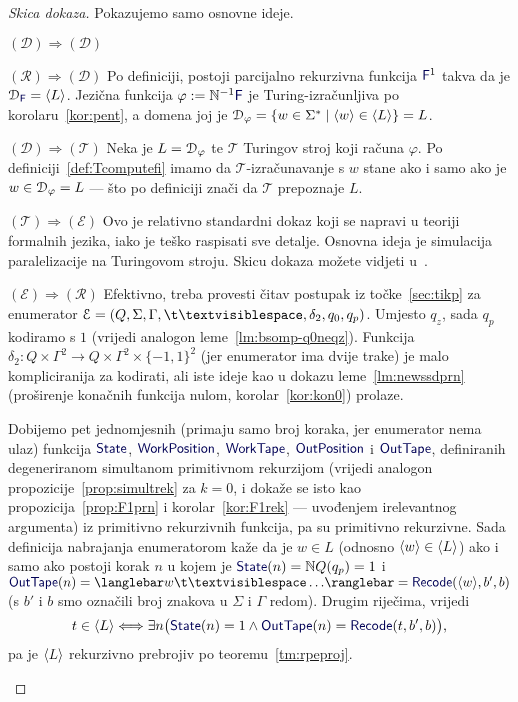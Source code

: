\begin{proof}[Skica dokaza] Pokazujemo samo osnovne ideje.
\begin{labeling}{$(\mathcal D)\Rightarrow(\mathcal D)$}
\item[$(\mathcal R)\Rightarrow(\mathcal D)$]
Po definiciji, postoji parcijalno rekurzivna funkcija $\f F^1$ takva da je $\dom{\f F}=\kr L$. Jezična funkcija $\varphi:=\N^{-1}\f F$ je Turing-izračunljiva po korolaru~\ref{kor:pent}, a domena joj je $\mathcal D_{\varphi}=\{w\in\Sigma^*\mid\langle w\rangle\in\langle L\rangle\}=L$.

\item[$(\mathcal D)\Rightarrow(\mathcal T)$]
Neka je $L=\mathcal D_{\varphi}$ te $\mathcal T$ Turingov stroj koji računa $\varphi$. Po definiciji~\ref{def:Tcomputefi} imamo da $\mathcal T$\!-izračunavanje s $w$ stane ako i samo ako je $w\in\mathcal D_{\varphi}=L$ --- što po definiciji znači da $\mathcal T$ prepoznaje $L$.

\item[$(\mathcal T)\Rightarrow(\mathcal E)$]
Ovo je relativno standardni dokaz koji se napravi u teoriji formalnih jezika, iako je teško raspisati sve detalje. Osnovna ideja je simulacija paralelizacije na Turingovom stroju. Skicu dokaza možete vidjeti u~\cite[\emph{theorem}~3.21]{sipser}.

\item[$(\mathcal E)\Rightarrow(\mathcal R)$]
Efektivno, treba provesti čitav postupak iz točke~\ref{sec:tikp} za enumerator $\mathcal E=(Q,\Sigma,\Gamma,\bl,\delta_2,q_0,q_p)$. Umjesto $q_z$, sada $q_p$ kodiramo s $1$ (vrijedi analogon leme~\ref{lm:bsomp-q0neqz}). Funkcija $\delta_2:Q\times\Gamma^2\to Q\times\Gamma^2\times\{-1,1\}^2$ (jer enumerator ima dvije trake) je malo kompliciranija za kodirati, ali iste ideje kao u dokazu leme~\ref{lm:newssdprn} (proširenje konačnih funkcija nulom, korolar~\ref{kor:kon0}) prolaze.

Dobijemo pet jednomjesnih (primaju samo broj koraka, jer enumerator nema ulaz) funkcija $\f{State}$, $\f{WorkPosition}$, $\f{WorkTape}$, $\f{OutPosition}$ i $\f{OutTape}$, definiranih degeneriranom simultanom primitivnom rekurzijom (vrijedi analogon propozicije~\ref{prop:simultrek} za $k=0$, i dokaže se isto kao propozicija~\ref{prop:F1prn} i korolar~\ref{kor:F1rek} --- uvođenjem irelevantnog argumenta) iz primitivno rekurzivnih funkcija, pa su primitivno rekurzivne. Sada definicija nabrajanja enumeratorom kaže da je $w\in L$ (odnosno $\langle w\rangle\in\langle L\rangle$) ako i samo ako postoji korak $n$ u kojem je $\f{State}(n)=\N Q(q_p)=1$ i $\f{OutTape}(n)=\knk{w\bl\ldots}=\f{Recode}(\kr w,b',b)$ (s $b'$ i $b$ smo označili broj znakova u $\Sigma$ i $\Gamma$ redom). Drugim riječima, vrijedi
\begin{equation}
    t\in\kr L\Longleftrightarrow\exists n\bigl(\f{State}(n)=1\land\f{OutTape}(n)=\f{Recode}(t,b',b)\bigr)\text,
\end{equation}
pa je $\langle L\rangle$ rekurzivno prebrojiv po teoremu~\ref{tm:rpeproj}.\qedhere
\end{labeling}
\end{proof}
